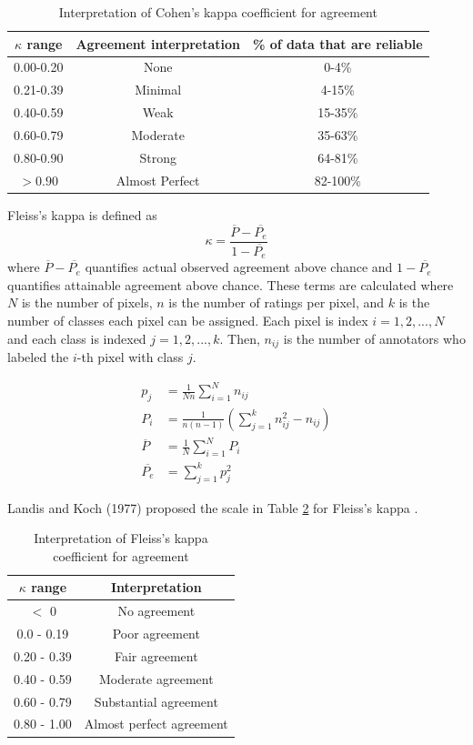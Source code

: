 \documentclass[twoside]{report}
\begin{document}
\begin{table}[ht!]
  \centering
  \begin{tabular}{|c c c|}
  \hline    
$\kappa$ range &  Agreement interpretation & \% of data that are reliable \\
\hline \hline
0.00-0.20	& None &	0-4\% \\
0.21-0.39	& Minimal &	4-15\% \\
0.40-0.59 & Weak & 15-35\% \\
0.60-0.79	& Moderate & 35-63\% \\
0.80-0.90 & Strong &64-81\% \\
$>0.90$  & Almost Perfect	& 82-100\% \\
\hline
  \end{tabular}
  \caption{Interpretation of Cohen's kappa coefficient for agreement \cite{cohens}}
  \label{tab:cohens}
\end{table}

Fleiss's kappa is defined as \[ \kappa = \frac{\overline{P} -    \overline{P_e}}{1-\overline{P_e}} \] where $\overline{P} - \overline{P_e}$ quantifies actual observed agreement above chance and $1 - \overline{P_e}$ quantifies attainable agreement above chance. These terms are calculated where $N$ is the number of pixels, $n$ is the number of ratings per pixel, and $k$ is the number of classes each pixel can be assigned. Each pixel is index $i = 1, 2, ..., N$ and each class is indexed $j = 1, 2, ..., k$. Then, $n_{ij}$ is the number of annotators who labeled the $i$-th pixel with class $j$. 

\begin{align*}
p_j &= \frac{1}{Nn} \sum_{i=1}^{N} n_{ij} \\
P_i &= \frac{1}{n(n-1)} \left(\sum_{j=1}^{k} n_{ij}^2 - n_{ij} \right) \\
\overline{P} &= \frac{1}{N} \sum_{i=1}^N P_i \\
\overline{P_e} &= \sum_{j=1}^k p_j^2
\end{align*}

Landis and Koch (1977) proposed the scale in Table \ref{tab:fleiss} for Fleiss's kappa \cite{landiskoch}. 

\begin{table}[ht!]
  \centering
  \begin{tabular}{|c c|}
  \hline    
$\kappa$ range &  Interpretation \\
\hline \hline
$<$ 0 & No agreement \\ 
0.0 - 0.19 & Poor agreement \\ 
0.20 - 0.39 & Fair agreement \\
0.40 - 0.59 & Moderate agreement \\
0.60 - 0.79 & Substantial agreement \\ 
0.80 - 1.00 & Almost perfect agreement \\
\hline
  \end{tabular}
  \caption{Interpretation of Fleiss's kappa coefficient for agreement}
  \label{tab:fleiss}
\end{table}
\end{document}
